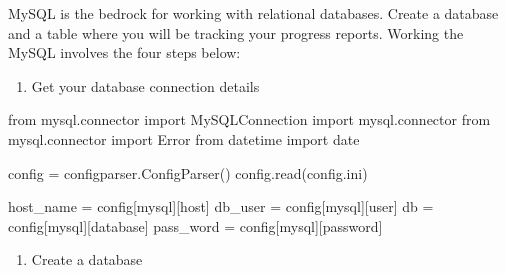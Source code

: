 \documentclass[
  letterpaper,
  DIV=11,
  numbers=noendperiod]{scrreprt}
\newenvironment{Shaded}{\begin{snugshade}}{\end{snugshade}}
\newcommand{\ImportTok}[1]{\textcolor[rgb]{0.00,0.46,0.62}{#1}}
\newcommand{\NormalTok}[1]{\textcolor[rgb]{0.00,0.23,0.31}{#1}}
\newcommand{\OperatorTok}[1]{\textcolor[rgb]{0.37,0.37,0.37}{#1}}
\newcommand{\StringTok}[1]{\textcolor[rgb]{0.13,0.47,0.30}{#1}}
\providecommand{\tightlist}{%
  \setlength{\itemsep}{0pt}\setlength{\parskip}{0pt}}\usepackage{longtable,booktabs,array}
\begin{document}
MySQL is the bedrock for working with relational databases. Create a
database and a table where you will be tracking your progress reports.
Working the MySQL involves the four steps below:

\begin{enumerate}
\def\labelenumi{\arabic{enumi}.}
\tightlist
\item
  Get your database connection details
\end{enumerate}

\begin{Shaded}
\begin{Highlighting}[]
\ImportTok{from}\NormalTok{ mysql.connector }\ImportTok{import}\NormalTok{ MySQLConnection}
\ImportTok{import}\NormalTok{ mysql.connector}
\ImportTok{from}\NormalTok{ mysql.connector }\ImportTok{import}\NormalTok{ Error}
\ImportTok{from}\NormalTok{ datetime }\ImportTok{import}\NormalTok{ date}


\NormalTok{config }\OperatorTok{=}\NormalTok{ configparser.ConfigParser()}
\NormalTok{config.read(}\StringTok{\textquotesingle{}config.ini\textquotesingle{}}\NormalTok{)}


\NormalTok{host\_name }\OperatorTok{=}\NormalTok{ config[}\StringTok{\textquotesingle{}mysql\textquotesingle{}}\NormalTok{][}\StringTok{\textquotesingle{}host\textquotesingle{}}\NormalTok{]}
\NormalTok{db\_user }\OperatorTok{=}\NormalTok{ config[}\StringTok{\textquotesingle{}mysql\textquotesingle{}}\NormalTok{][}\StringTok{\textquotesingle{}user\textquotesingle{}}\NormalTok{]}
\NormalTok{db }\OperatorTok{=}\NormalTok{ config[}\StringTok{\textquotesingle{}mysql\textquotesingle{}}\NormalTok{][}\StringTok{\textquotesingle{}database\textquotesingle{}}\NormalTok{]}
\NormalTok{pass\_word }\OperatorTok{=}\NormalTok{ config[}\StringTok{\textquotesingle{}mysql\textquotesingle{}}\NormalTok{][}\StringTok{\textquotesingle{}password\textquotesingle{}}\NormalTok{]}
\end{Highlighting}
\end{Shaded}

\begin{enumerate}
\def\labelenumi{\arabic{enumi}.}
\setcounter{enumi}{1}
\tightlist
\item
  Create a database
\end{enumerate}
\end{document}
